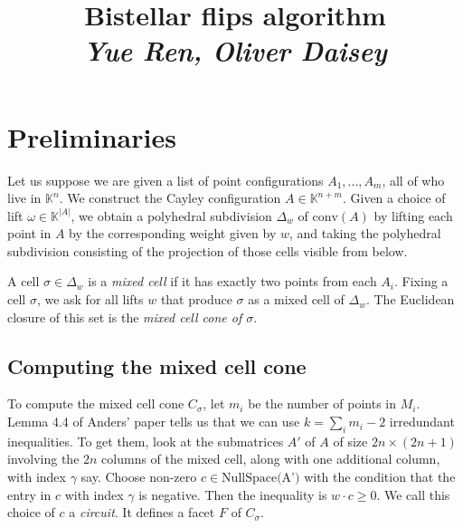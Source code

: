 \documentclass[a4paper,12pt]{article}
\author{}
\date{}
\title{\LARGE \textbf{Bistellar flips algorithm} \\ \vspace{3mm} \Large \textit{Yue Ren, Oliver Daisey}}
\newcommand{\conv}[1]{\text{conv}(#1)}
\begin{document}
\maketitle

\section{Preliminaries}
Let us suppose we are given a list of point configurations $A_1, ..., A_m$, all of who live in $\mathbb{K}^n$. We construct the Cayley configuration $A \in \mathbb{K}^{n+m}$. Given a choice of lift $\omega \in  \mathbb{K}^{|A|}$, we obtain a polyhedral subdivision $\Delta_w$ of $\conv{A}$ by lifting each point in $A$ by the corresponding weight given by $w$, and taking the polyhedral subdivision consisting of the projection of those cells visible from below. 

A cell $\sigma \in \Delta_w$ is a \textit{mixed cell} if it has exactly two points from each $A_i$. Fixing a cell $\sigma$, we ask for all lifts $w$ that produce $\sigma$ as a mixed cell of $\Delta_w$. The Euclidean closure of this set is the \textit{mixed cell cone of $\sigma$}.

\subsection{Computing the mixed cell cone}
To compute the mixed cell cone $C_\sigma$, let $m_i$ be the number of points in $M_i$. Lemma 4.4 of Anders' paper tells us that we can use $k = \sum_i{m_i - 2}$ irredundant inequalities. To get them, look at the submatrices $A'$ of $A$ of size $2n \times (2n + 1)$ involving the $2n$ columns of the mixed cell, along with one additional column, with index $\gamma$ say. Choose non-zero $c \in \text{NullSpace(A')}$ with the condition that the entry in $c$ with index $\gamma$ is negative. Then the inequality is $w\cdot c \geq 0$. We call this choice of $c$ a \textit{circuit}. It defines a facet $F$ of $C_\sigma$.
\end{document}
